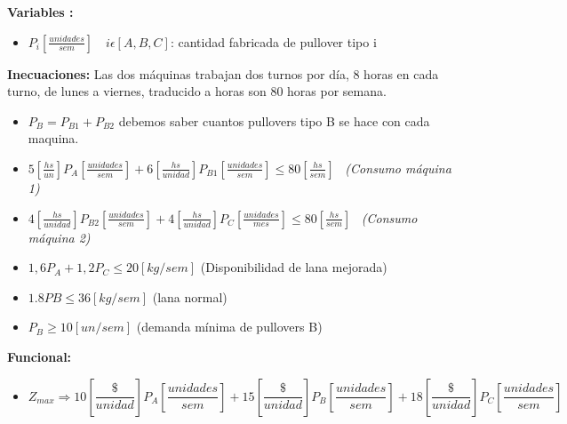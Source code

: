 \documentclass[12pt]{book}
\begin{document}
\textbf{Variables :}
\begin{itemize}
\item $P_i [\frac{unidades}{sem}] \quad i \epsilon [A,B,C]$: cantidad fabricada de pullover tipo i
\end{itemize}

\textbf{Inecuaciones: }
Las dos máquinas trabajan dos turnos por día, 8 horas en cada turno, de lunes a viernes, traducido a horas son 80 horas por semana.
\begin{itemize}
\item $P_B = P_{B1} + P_{B2} $ debemos saber cuantos pullovers tipo B se hace con cada maquina.
\item $5 [\frac{hs}{un}]  P_A [\frac{unidades}{sem}] + 6 [\frac{hs}{unidad}]  P_{B1} [\frac{unidades}{sem}] \leq 80 [\frac{hs}{sem}]  $ \, \textit{(Consumo máquina 1)}

\item $4 [\frac{hs}{unidad}]  P_{B2}[\frac{unidades}{sem}] + 4 [\frac{hs}{unidad}]  P_C[\frac{unidades}{mes}] \leq 80 [\frac{hs}{sem}]  $ \, \textit{ (Consumo máquina 2)}
\item $1,6 P_A +1,2 P_C \leq 20 [kg /sem]$ (Disponibilidad de lana mejorada)
\item $1.8 PB \leq 36 [kg /sem] $ (lana normal)
\item $ P_B \geq 10 [un/sem]$ (demanda mínima de pullovers B)
\end{itemize}
\pagebreak
\textbf{Funcional:} 
\begin{itemize}
\item \[ Z_{max} \Rightarrow 10[\frac{\$}{unidad}]  P_A[\frac{unidades}{sem}] + 15 [\frac{\$}{unidad}]  P_B [\frac{unidades}{sem}] + 18 [\frac{\$}{unidad}]  P_C [\frac{unidades}{sem}] \]
\end{itemize}
\end{document}
